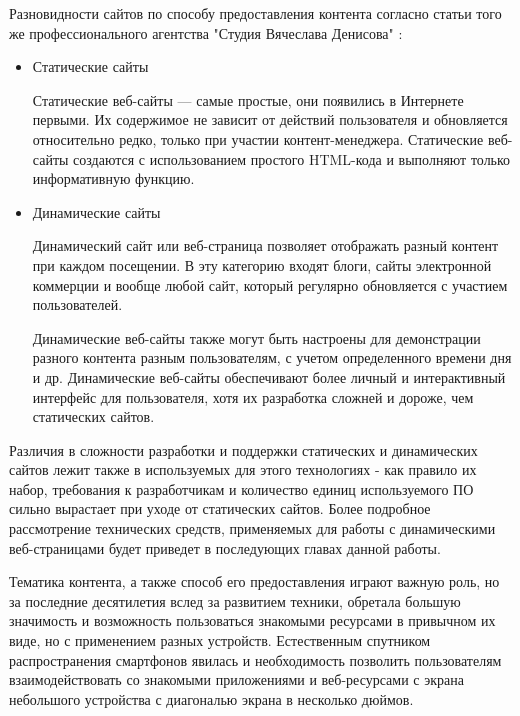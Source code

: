 Разновидности сайтов по способу предоставления контента согласно статьи того же профессионального агентства "Студия Вячеслава Денисова" \cite{denisov}:
\begin{itemize}
    \item Статические сайты

    Статические веб-сайты — самые простые, они появились в Интернете первыми.
    Их содержимое не зависит от действий пользователя и обновляется относительно редко, только при участии контент-менеджера.
    Статические веб-сайты создаются с использованием простого HTML-кода и выполняют только информативную функцию.
    
    \item Динамические сайты
    
    Динамический сайт или веб-страница позволяет отображать разный контент при каждом посещении.
    В эту категорию входят блоги, сайты электронной коммерции и вообще любой сайт, который регулярно обновляется с участием пользователей.
    
    Динамические веб-сайты также могут быть настроены для демонстрации разного контента разным пользователям, с учетом определенного времени дня и др.
    Динамические веб-сайты обеспечивают более личный и интерактивный интерфейс для пользователя, хотя их разработка сложней и дороже, чем статических сайтов.
\end{itemize}

Различия в сложности разработки и поддержки статических и динамических сайтов лежит также в используемых для этого технологиях - как правило их набор, требования к разработчикам и количество единиц используемого ПО сильно вырастает при уходе от статических сайтов.
Более подробное рассмотрение технических средств, применяемых для работы с динамическими веб-страницами будет приведет в последующих главах данной работы.

Тематика контента, а также способ его предоставления играют важную роль, но за последние десятилетия вслед за развитием техники, обретала большую значимость и возможность пользоваться знакомыми ресурсами в привычном их виде, но с применением разных устройств.
Естественным спутником распространения смартфонов явилась и необходимость позволить пользователям взаимодействовать со знакомыми приложениями и веб-ресурсами с экрана небольшого устройства с диагональю экрана в несколько дюймов.


